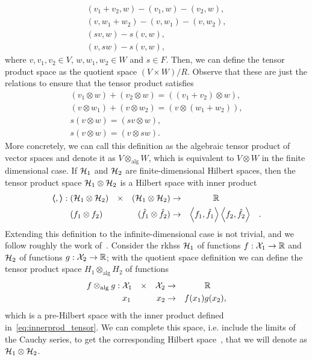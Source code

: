 \begin{align*}
    (v_1 + v_2, w) - (v_1, w) - (v_2, w), \\
    (v, w_1 + w_2) - (v, w_1) - (v, w_2), \\
    (sv, w) - s(v, w),                    \\
    (v, sw) - s(v, w),
\end{align*}
where $v, v_1, v_2 \in V$, $w, w_1, w_2 \in W$ and $s \in F$. Then, we can define the tensor product space as the quotient space $(V \times W)/R$. Observe that these are just the relations to ensure that the tensor product satisfies 
\begin{align*}
    (v_1 \otimes w) + (v_2 \otimes w) = ((v_1 + v_2) \otimes w),\\
    (v \otimes w_1) + (v \otimes w_2) = (v \otimes (w_1 + w_2)), \\
    s(v \otimes w) = (sv \otimes w),                    \\
    s(v \otimes w) = (v \otimes sw).
\end{align*}
More concretely, we can call this definition as the algebraic tensor product of vector spaces and denote it as $V \otimes_{\text{alg}} W$, which is equivalent to $V \otimes W$ in the finite dimensional case.
If $\mathcal{H}_1$ and $\mathcal{H}_2$ are finite-dimensional Hilbert spaces, then the tensor product space $\mathcal{H}_1 \otimes \mathcal{H}_2$ is a Hilbert space with inner product
\begin{equation}
    \label{eq:innerprod_tensor}
    \begin{aligned}
        \dotp{}{}:\; & (\rkhs_1 \otimes \rkhs_2) & \times &  & (\rkhs_1 \otimes \rkhs_2)     & \to & \reals                &                       &   \\
                     & (f_1 \otimes f_2)         &        &  & (\hat{f}_1 \otimes \hat{f}_2) & \to & \dotp{f_1}{\hat{f}_1} & \dotp{f_2}{\hat{f}_2} & .
    \end{aligned}
\end{equation}
%
Extending this definition to the infinite-dimensional case is not trivial, and we follow roughly the work of~\citet{Kadison1983}.
Consider the \acrshort{rkhss} $\mathcal{H}_1$ of functions  $f: \mathcal{X}_1 \to \mathbb{R}$ and $\mathcal{H}_2$ of functions $g: \mathcal{X}_2 \to \mathbb{R}$; with the quotient space definition we can define the tensor product space $H_1 \otimes_{\text{alg}} H_2$ of functions
\begin{equation}\nonumber
    \begin{aligned}
        f \otimes_{\text{alg}} g:\; & \mathcal{X}_1 & \times &  & \mathcal{X}_2 & \to &        & \mathbb{R}   \\
                                    & x_1      &      &  & x_2      & \to & f(x_1) & g(x_2) ,
    \end{aligned}
\end{equation}
which is a pre-Hilbert space with the inner product defined in~\eqref{eq:innerprod_tensor}.
We can complete this space, i.e. include the limits of the Cauchy series, to get the corresponding Hilbert space~\citep{Kadison1983}, that we will denote as $\mathcal{H}_1 \otimes \mathcal{H}_2$.

